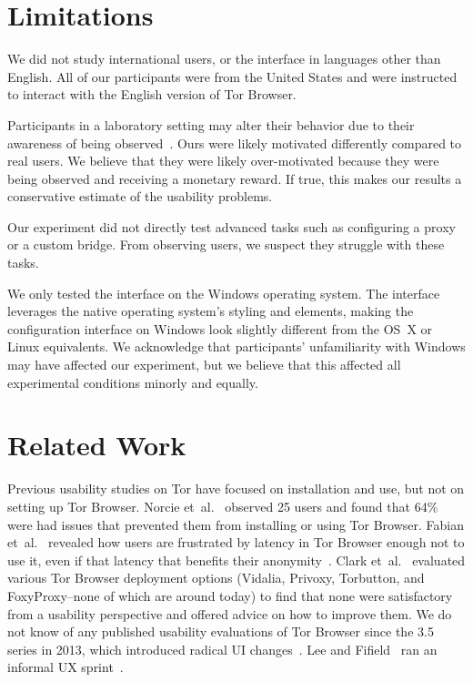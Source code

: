 \documentclass[USenglish,oneside,twocolumn]{article}
\begin{document}
\section{Limitations}
\label{sec:limitations}
We did not study international users, or the interface in languages other than English. All of our participants were from the United States and were instructed to interact with the English version of Tor Browser.

Participants in a laboratory setting may alter their behavior due to their awareness of being observed~\cite{mccarney2007hawthorne}. Ours were likely motivated differently compared to real users. We believe that they were likely over-motivated because they were being observed and receiving a monetary reward. If true, this makes our results a conservative estimate of the usability problems. 

Our experiment did not directly test advanced tasks such as configuring a proxy or a custom bridge. From observing  users, we suspect they struggle with these tasks. 

We only tested the interface on the Windows operating system. The interface leverages the native operating system's styling and elements, making the configuration interface on Windows look slightly different from the OS~X or Linux equivalents. We acknowledge that participants' unfamiliarity with Windows may have affected our experiment, but we believe that this affected all experimental conditions minorly and equally.  

\section{Related Work}
\label{sec:related} 
Previous usability studies on Tor have focused on installation and use, but not on setting up Tor Browser. Norcie et~al.~\cite{norcie2012eliminating} observed 25 users and found that 64\% were had issues that prevented them from installing or using Tor Browser. Fabian et~al.~\cite{fabian2010privately} revealed how users are frustrated by latency in Tor Browser enough not to use it, even if that latency that benefits their anonymity~\cite{dingledine2009performance}. Clark et~al.~\cite{clark2007usability} evaluated various Tor Browser deployment options (Vidalia, Privoxy, Torbutton, and FoxyProxy--none of which are around today) to find that none were satisfactory from a usability perspective and offered advice on how to improve them. We do not know of any published usability evaluations of Tor Browser since the 3.5 series in 2013, which introduced radical UI changes~\cite{torbrowser-35}. Lee and Fifield~\cite{uxsprint} ran an informal UX sprint~\cite{uxsprint2015-tickets}.
\end{document}
